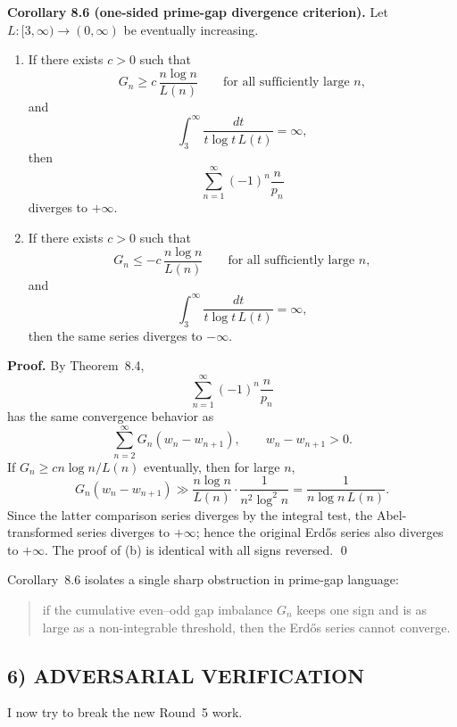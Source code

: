\medskip

\textbf{Corollary 8.6 (one-sided prime-gap divergence criterion).}
Let $L:[3,\infty)\to(0,\infty)$ be eventually increasing.

\begin{enumerate}
\item[(a)] If there exists $c>0$ such that
\[
G_n\ge c\,\frac{n\log n}{L(n)}
\qquad \text{for all sufficiently large } n,
\]
and
\[
\int_3^\infty \frac{dt}{t\log t\,L(t)}=\infty,
\]
then
\[
\sum_{n=1}^\infty (-1)^n\frac{n}{p_n}
\]
diverges to $+\infty$.

\item[(b)] If there exists $c>0$ such that
\[
G_n\le -c\,\frac{n\log n}{L(n)}
\qquad \text{for all sufficiently large } n,
\]
and
\[
\int_3^\infty \frac{dt}{t\log t\,L(t)}=\infty,
\]
then the same series diverges to $-\infty$.
\end{enumerate}

\textbf{Proof.}
By Theorem~8.4,
\[
\sum_{n=1}^\infty (-1)^n\frac{n}{p_n}
\]
has the same convergence behavior as
\[
\sum_{n=2}^\infty G_n(w_n-w_{n+1}),
\qquad w_n-w_{n+1}>0.
\]
If $G_n\ge c n\log n/L(n)$ eventually, then for large $n$,
\[
G_n(w_n-w_{n+1})
\gg
\frac{n\log n}{L(n)}\cdot \frac{1}{n^2\log^2 n}
=
\frac{1}{n\log n\,L(n)}.
\]
Since the latter comparison series diverges by the integral test, the Abel-transformed series diverges to $+\infty$; hence the original Erd\H{o}s series also diverges to $+\infty$.
The proof of (b) is identical with all signs reversed. \qed

\medskip

Corollary~8.6 isolates a single sharp obstruction in prime-gap language:
\begin{quote}
if the cumulative even--odd gap imbalance $G_n$ keeps one sign and is as large as a non-integrable threshold, then the Erd\H{o}s series cannot converge.
\end{quote}

\subsection*{6) ADVERSARIAL VERIFICATION}

I now try to break the new Round~5 work.

